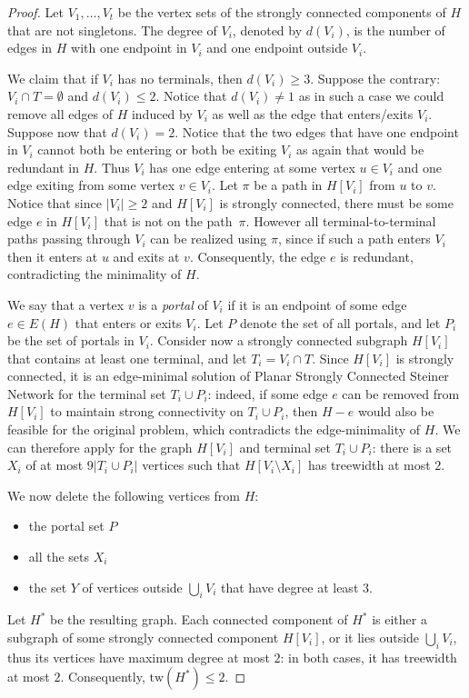 \documentclass[a4paper,11pt]{article}
\newcommand{\tw}{\mathrm{tw}}
\theoremstyle{plain}
\newtheorem{identification rule}{Identification Rule}
\theoremstyle{definition}
\theoremstyle{remark}
\newcommand{\scssfull}{{\sc Planar Strongly Connected Steiner Network}\xspace}
\begin{document}
\begin{proof}
Let $V_1,\dots,V_t$ be the vertex sets of the strongly connected components of $H$ that are not singletons. The degree of $V_i$, denoted by $d(V_i)$, is the number of edges in $H$ with one endpoint in $V_i$ and one endpoint outside $V_i$.

We claim that if $V_i$ has no terminals, then  $d(V_i)\geq 3$. Suppose the contrary: $V_i\cap T=\emptyset$ and $d(V_i)\leq 2$. Notice that $d(V_i)\neq 1$ as in such a case we could remove all edges of $H$ induced by $V_i$ as well as the edge that enters/exits $V_i$. Suppose now that $d(V_i)=2$. Notice that the two edges that have one endpoint in $V_i$ cannot both be entering or both be exiting $V_i$ as again that would be redundant in $H$. Thus $V_i$ has one edge entering at some vertex $u\in V_i$ and one edge exiting from some vertex $v\in V_i$. Let $\pi$ be a path in $H[V_i]$ from $u$ to $v$. Notice that since $|V_i|\geq 2$ and $H[V_i]$ is strongly connected, there must be some edge $e$ in $H[V_i]$ that is not on the path~$\pi$. However all terminal-to-terminal paths passing through $V_i$ can be realized using $\pi$, since if such a path enters $V_i$ then it enters at $u$ and exits at $v$. Consequently, the edge $e$ is redundant, contradicting the minimality of $H$.

We say that a vertex $v$ is a \emph{portal} of $V_i$ if it is an endpoint of some edge $e\in E(H)$ that enters or exits $V_i$. Let $P$ denote the set of all portals, and let $P_i$ be the set of portals in $V_i$. Consider now a strongly connected subgraph $H[V_i]$ that contains at least one terminal, and let $T_i=V_i\cap T$. Since $H[V_i]$ is strongly connected, it is an edge-minimal solution of \scssfull for the terminal set $T_i\cup P_i$: indeed, if some edge $e$ can be removed from $H[V_i]$ to maintain strong connectivity on $T_i\cup P_i$, then $H-e$ would also be feasible for the original problem, which contradicts the edge-minimality of $H$. We can therefore apply  for the graph $H[V_i]$ and terminal set $T_i\cup P_i$: there is a set $X_i$ of at most $9|T_i\cup P_i|$ vertices such that $H[V_i\setminus X_i]$ has treewidth at most $2$.

We now delete the following vertices from $H$:
\begin{itemize}
\item the portal set $P$
\item all the sets $X_i$
\item the set $Y$ of vertices outside $\bigcup_i V_i$ that have degree at least $3$.
\end{itemize}
Let $H^*$ be the resulting graph. Each connected component of $H^*$ is either a subgraph of some strongly connected component $H[V_i]$, or it lies outside $\bigcup_i V_i$, thus its vertices have maximum degree at most $2$: in both cases, it has treewidth at most $2$. Consequently, $\tw(H^*)\leq 2$.


\end{proof}
\end{document}
